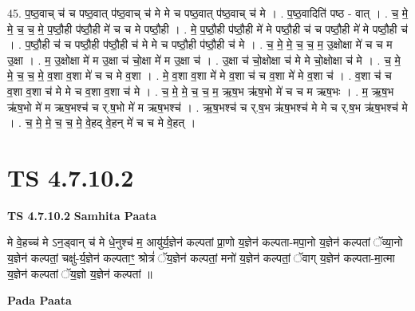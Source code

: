 \documentclass[17pt]{extarticle}
\begin{document}
45. प॒ष्ठ॒वाच् च॑ च पष्ठ॒वात् प॑ष्ठ॒वाच् च॑ मे मे च पष्ठ॒वात् प॑ष्ठ॒वाच् च॑ मे । . प॒ष्ठ॒वादिति॑ पष्ठ - वात् । . च॒ मे॒ मे॒ च॒ च॒ मे॒ प॒ष्ठौ॒ही प॑ष्ठौ॒ही मे॑ च च मे पष्ठौ॒ही । . मे॒ प॒ष्ठौ॒ही प॑ष्ठौ॒ही मे॑ मे पष्ठौ॒ही च॑ च पष्ठौ॒ही मे॑ मे पष्ठौ॒ही च॑ । . प॒ष्ठौ॒ही च॑ च पष्ठौ॒ही प॑ष्ठौ॒ही च॑ मे मे च पष्ठौ॒ही प॑ष्ठौ॒ही च॑ मे । . च॒ मे॒ मे॒ च॒ च॒ म॒ उ॒क्षोक्षा मे॑ च च म उ॒क्षा । . म॒ उ॒क्षोक्षा मे॑ म उ॒क्षा च॑ चो॒क्षा मे॑ म उ॒क्षा च॑ । . उ॒क्षा च॑ चो॒क्षोक्षा च॑ मे मे चो॒क्षोक्षा च॑ मे । . च॒ मे॒ मे॒ च॒ च॒ मे॒ व॒शा व॒शा मे॑ च च मे व॒शा । . मे॒ व॒शा व॒शा मे॑ मे व॒शा च॑ च व॒शा मे॑ मे व॒शा च॑ । . व॒शा च॑ च व॒शा व॒शा च॑ मे मे च व॒शा व॒शा च॑ मे । . च॒ मे॒ मे॒ च॒ च॒ म॒ ऋ॒ष॒भ ऋ॑ष॒भो मे॑ च च म ऋष॒भः । . म॒ ऋ॒ष॒भ ऋ॑ष॒भो मे॑ म ऋष॒भश्च॑ च र्.ष॒भो मे॑ म ऋष॒भश्च॑ । . ऋ॒ष॒भश्च॑ च र्.ष॒भ ऋ॑ष॒भश्च॑ मे मे च र्.ष॒भ ऋ॑ष॒भश्च॑ मे । . च॒ मे॒ मे॒ च॒ च॒ मे॒ वे॒हद् वे॒हन् मे॑ च च मे वे॒हत् । \newline
\pagebreak
{}

\section{ TS 4.7.10.2 }

\textbf{TS 4.7.10.2 } \newline
\textbf{Samhita Paata} \newline

मे वे॒हच्च॑ मे ऽन॒ड्वान् च॑ मे धे॒नुश्च॑ म॒ आयु॑र्य॒ज्ञेन॑ कल्पतां प्रा॒णो य॒ज्ञेन॑ कल्पता-मपा॒नो य॒ज्ञेन॑ कल्पतां ॅव्या॒नो य॒ज्ञेन॑ कल्पतां॒ चक्षु॑-र्य॒ज्ञेन॑ कल्पताꣳ॒॒ श्रोत्रं॑ ॅय॒ज्ञेन॑ कल्पतां॒ मनो॑ य॒ज्ञेन॑ कल्पतां॒ ॅवाग् य॒ज्ञेन॑ कल्पता-मा॒त्मा य॒ज्ञेन॑ कल्पतां ॅय॒ज्ञो य॒ज्ञेन॑ कल्पतां ॥ \newline

\textbf{Pada Paata} \newline
\end{document}
